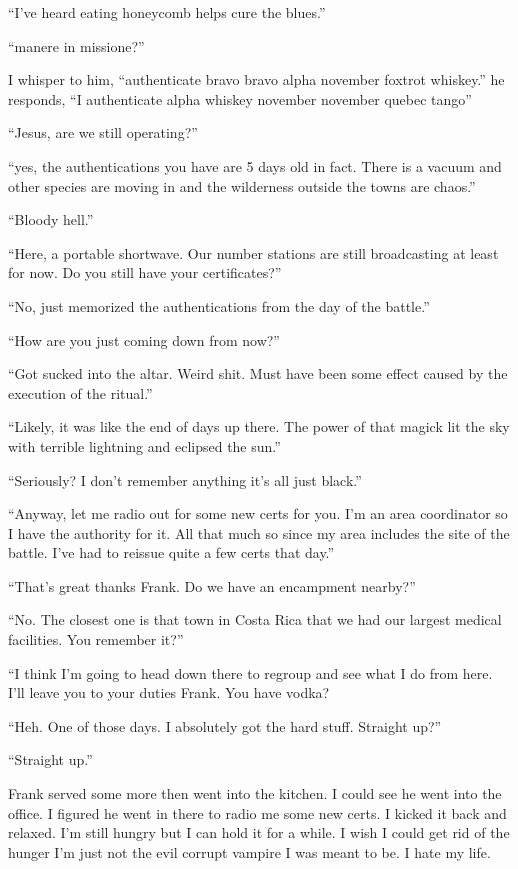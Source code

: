 ``I've heard eating honeycomb helps cure the blues.''

``manere in missione?''

I whisper to him, ``authenticate bravo bravo alpha november foxtrot whiskey.''
he responds, ``I authenticate alpha whiskey november november quebec tango''

``Jesus, are we still operating?''

``yes, the authentications you have are 5 days old in fact. There is a vacuum and other species are moving in and the wilderness outside the towns are chaos.''

``Bloody hell.''

``Here, a portable shortwave. Our number stations are still broadcasting at least for now. Do you still have your certificates?''

``No, just memorized the authentications from the day of the battle.''

``How are you just coming down from \chichenitza now?''

``Got sucked into the altar. Weird shit. Must have been some effect caused by the execution of the ritual.''

``Likely, it was like the end of days up there. The power of that magick lit the sky with terrible lightning and eclipsed the sun.''

``Seriously? I don't remember anything it's all just black.''

``Anyway, let me radio out for some new certs for you. I'm an area coordinator so I have the authority for it. All that much so since my area includes the site of the battle. I've had to reissue quite a few certs that day.''

``That's great thanks Frank. Do we have an encampment nearby?''

``No. The closest one is that town in Costa Rica that we had our largest medical facilities. You remember it?''

``I think I'm going to head down there to regroup and see what I do from here. I'll leave you to your duties Frank. You have vodka?

``Heh. One of those days. I absolutely got the hard stuff. Straight up?''

``Straight up.''

Frank served some more then went into the kitchen. I could see he went into the office. I figured he went in there to radio me some new certs. I kicked it back and relaxed. I'm still hungry but I can hold it for a while. I wish I could get rid of the hunger I'm just not the evil corrupt vampire I was meant to be. I hate my life.

